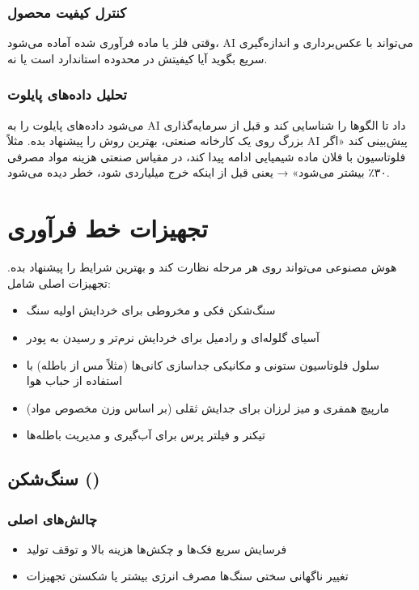 \subsubsection*{کنترل کیفیت محصول}
وقتی فلز یا ماده فرآوری شده آماده می‌شود، AI می‌تواند با عکس‌برداری و اندازه‌گیری سریع بگوید آیا کیفیتش در محدوده استاندارد است یا نه.

\subsubsection*{تحلیل داده‌های پایلوت}
می‌شود داده‌های پایلوت را به AI داد تا الگوها را شناسایی کند و قبل از سرمایه‌گذاری بزرگ روی یک کارخانه صنعتی، بهترین روش را پیشنهاد بده. مثلاً AI پیش‌بینی کند «اگر فلوتاسیون با فلان ماده شیمیایی ادامه پیدا کند، در مقیاس صنعتی هزینه مواد مصرفی ۳۰٪ بیشتر می‌شود» → یعنی قبل از اینکه خرج میلیاردی شود، خطر دیده می‌شود.

\section{تجهیزات خط فرآوری}

هوش مصنوعی می‌تواند روی هر مرحله نظارت کند و بهترین شرایط را پیشنهاد بده. تجهیزات اصلی شامل:
\begin{itemize}
  \item سنگ‌شکن فکی و مخروطی  برای خردایش اولیه سنگ
  \item آسیای گلوله‌ای و رادمیل  برای خردایش نرم‌تر و رسیدن به پودر
  \item سلول فلوتاسیون ستونی و مکانیکی  جداسازی کانی‌ها (مثلاً مس از باطله) با استفاده از حباب هوا
  \item مارپیچ همفری و میز لرزان  برای جدایش ثقلی (بر اساس وزن مخصوص مواد)
  \item تیکنر و فیلتر پرس  برای آب‌گیری و مدیریت باطله‌ها
\end{itemize}

\subsection{سنگ‌شکن ()}

\subsubsection*{چالش‌های اصلی}
\begin{itemize}
  \item فرسایش سریع فک‌ها و چکش‌ها  هزینه بالا و توقف تولید
  \item تغییر ناگهانی سختی سنگ‌ها  مصرف انرژی بیشتر یا شکستن تجهیزات
\end{itemize}

